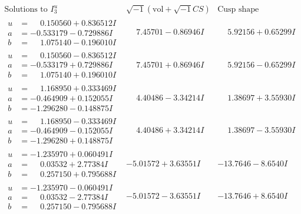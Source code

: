 \documentclass[1p]{elsarticle_modified}
\theoremstyle{definition}
\newcommand{\I}{\sqrt{-1}}
\begin{document}
$$\begin{array}{c|c|c}  
\text{Solutions to }I^u_{3}& \I (\text{vol} + \sqrt{-1}CS) & \text{Cusp shape}\\
 \hline 
\begin{aligned}
u &= \phantom{-}0.150560 + 0.836512 I \\
a &= -0.533179 - 0.729886 I \\
b &= \phantom{-}1.075140 - 0.196010 I\end{aligned}
 & \phantom{-}7.45701 - 0.86946 I & \phantom{-}5.92156 + 0.65299 I \\ \hline\begin{aligned}
u &= \phantom{-}0.150560 - 0.836512 I \\
a &= -0.533179 + 0.729886 I \\
b &= \phantom{-}1.075140 + 0.196010 I\end{aligned}
 & \phantom{-}7.45701 + 0.86946 I & \phantom{-}5.92156 - 0.65299 I \\ \hline\begin{aligned}
u &= \phantom{-}1.168950 + 0.333469 I \\
a &= -0.464909 + 0.152055 I \\
b &= -1.296280 - 0.148875 I\end{aligned}
 & \phantom{-}4.40486 - 3.34214 I & \phantom{-}1.38697 + 3.55930 I \\ \hline\begin{aligned}
u &= \phantom{-}1.168950 - 0.333469 I \\
a &= -0.464909 - 0.152055 I \\
b &= -1.296280 + 0.148875 I\end{aligned}
 & \phantom{-}4.40486 + 3.34214 I & \phantom{-}1.38697 - 3.55930 I \\ \hline\begin{aligned}
u &= -1.235970 + 0.060491 I \\
a &= \phantom{-}0.03532 + 2.77384 I \\
b &= \phantom{-}0.257150 + 0.795688 I\end{aligned}
 & -5.01572 + 3.63551 I & -13.7646 - 8.6540 I \\ \hline\begin{aligned}
u &= -1.235970 - 0.060491 I \\
a &= \phantom{-}0.03532 - 2.77384 I \\
b &= \phantom{-}0.257150 - 0.795688 I\end{aligned}
 & -5.01572 - 3.63551 I & -13.7646 + 8.6540 I \\ \hline\begin{aligned}

\end{aligned}
\end{array}$$
\end{document}
